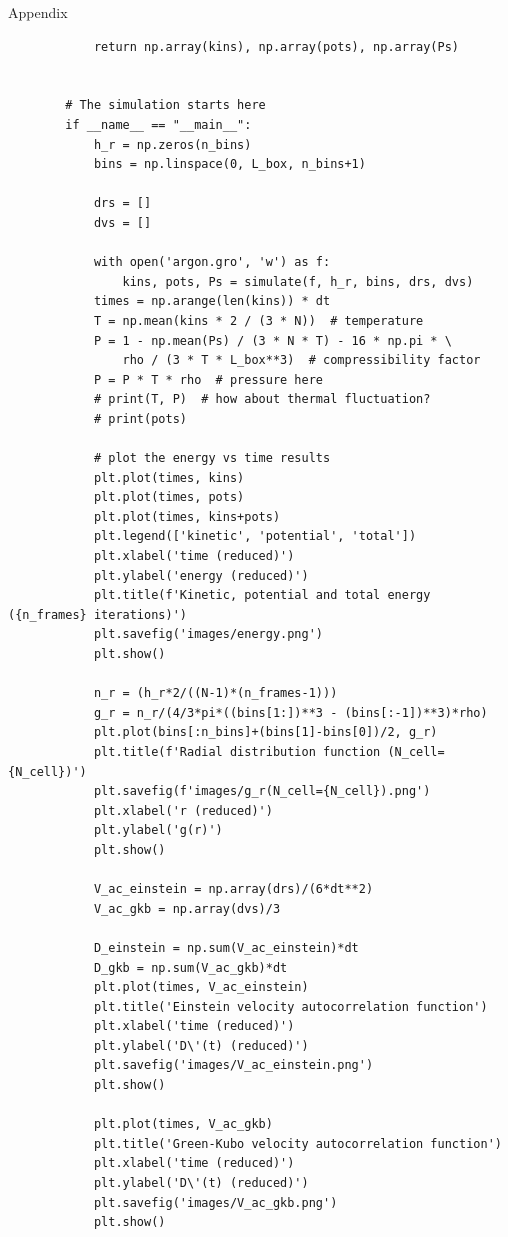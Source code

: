 \documentclass{article}
\begin{document}
\begin{section}{Appendix}
\begin{enumerate}
\begin{verbatim}
            return np.array(kins), np.array(pots), np.array(Ps)


        # The simulation starts here
        if __name__ == "__main__":
            h_r = np.zeros(n_bins)
            bins = np.linspace(0, L_box, n_bins+1)

            drs = []
            dvs = []

            with open('argon.gro', 'w') as f:
                kins, pots, Ps = simulate(f, h_r, bins, drs, dvs)
            times = np.arange(len(kins)) * dt
            T = np.mean(kins * 2 / (3 * N))  # temperature
            P = 1 - np.mean(Ps) / (3 * N * T) - 16 * np.pi * \
                rho / (3 * T * L_box**3)  # compressibility factor
            P = P * T * rho  # pressure here
            # print(T, P)  # how about thermal fluctuation?
            # print(pots)

            # plot the energy vs time results
            plt.plot(times, kins)
            plt.plot(times, pots)
            plt.plot(times, kins+pots)
            plt.legend(['kinetic', 'potential', 'total'])
            plt.xlabel('time (reduced)')
            plt.ylabel('energy (reduced)')
            plt.title(f'Kinetic, potential and total energy ({n_frames} iterations)')
            plt.savefig('images/energy.png')
            plt.show()

            n_r = (h_r*2/((N-1)*(n_frames-1)))
            g_r = n_r/(4/3*pi*((bins[1:])**3 - (bins[:-1])**3)*rho)
            plt.plot(bins[:n_bins]+(bins[1]-bins[0])/2, g_r)
            plt.title(f'Radial distribution function (N_cell={N_cell})')
            plt.savefig(f'images/g_r(N_cell={N_cell}).png')
            plt.xlabel('r (reduced)')
            plt.ylabel('g(r)')
            plt.show()

            V_ac_einstein = np.array(drs)/(6*dt**2)
            V_ac_gkb = np.array(dvs)/3

            D_einstein = np.sum(V_ac_einstein)*dt
            D_gkb = np.sum(V_ac_gkb)*dt
            plt.plot(times, V_ac_einstein)
            plt.title('Einstein velocity autocorrelation function')
            plt.xlabel('time (reduced)')
            plt.ylabel('D\'(t) (reduced)')
            plt.savefig('images/V_ac_einstein.png')
            plt.show()

            plt.plot(times, V_ac_gkb)
            plt.title('Green-Kubo velocity autocorrelation function')
            plt.xlabel('time (reduced)')
            plt.ylabel('D\'(t) (reduced)')
            plt.savefig('images/V_ac_gkb.png')
            plt.show()


\end{verbatim}
\end{enumerate}
\end{section}
\end{document}
